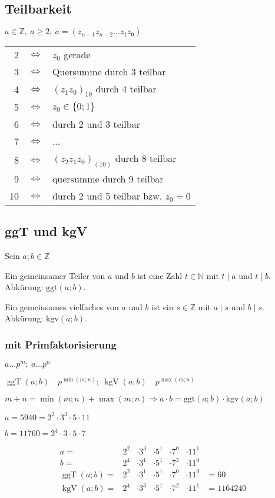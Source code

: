 \documentclass[12pt,a4paper]{article}
\DeclareMathOperator\ggt{ggT}
\DeclareMathOperator\kgv{kgV}
\begin{document}
\subsection{Teilbarkeit}
$a \in \mathbb{Z},\ a \geq 2,\ a=(z_{n-1}z_{n-2} \dots z_1z_0)$ \\
\begin{tabular}{rcl}
	2  & $\Leftrightarrow$ & $z_0$ gerade                         \\
	3  & $\Leftrightarrow$ & Quersumme durch 3 teilbar            \\
	4  & $\Leftrightarrow$ & $(z_1z_0)_{10}$ durch 4 teilbar      \\
	5  & $\Leftrightarrow$ & $z_0 \in \lbrace 0; 1 \rbrace$       \\
	6  & $\Leftrightarrow$ & durch 2 und 3 teilbar                \\
	7  & $\Leftrightarrow$ & ...                                  \\
	8  & $\Leftrightarrow$ & $(z_2z_1z_0)_{(10)}$ durch 8 teilbar \\
	9  & $\Leftrightarrow$ & quersumme durch 9 teilbar            \\
	10 & $\Leftrightarrow$ & durch 2 und 5 teilbar bzw. $z_0=0$
\end{tabular}
\subsection{ggT und kgV}
Sein $a;b \in \mathbb{Z}$

Ein gemeinsamer Teiler von $a$ und $b$ ist eine Zahl $t \in \mathbb{N}$ mit $t \mid a$ und $t \mid b$. Abkürung: $\textrm{ggt}(a;b)$.

Ein gemeinsames vielfaches von $a$ und $b$ ist ein $s \in \mathbb{Z}$ mit $a \mid s$ und $b \mid s$. Abkürung: $\textrm{kgv}(a;b)$.

\subsubsection{mit Primfaktorisierung}
$a \dots p^m;\ a \dots p^n$

$\ggt(a;b)\quad p^{\min(m;n)};\ \kgv(a;b)\quad p^{\max(m;n)}$

$m + n = \min(m;n) + \max(m;n) \Rightarrow a \cdot b = \textrm{ggt}(a;b) \cdot \textrm{kgv}(a;b)$

$a = 5940 = 2^2 \cdot 3^3 \cdot 5 \cdot 11$

$b = 11760 = 2^4 \cdot 3 \cdot 5 \cdot 7$

$$\begin{array}{rcccccl}
		a =         & 2^2 & \cdot 3^3 & \cdot 5^1 & \cdot 7^0 & \cdot 11^1             \\
		b =         & 2^4 & \cdot 3^1 & \cdot 5^1 & \cdot 7^2 & \cdot 11^0             \\
		\ggt(a;b) = & 2^2 & \cdot 3^1 & \cdot 5^1 & \cdot 7^0 & \cdot 11^0 & = 60      \\
		\kgv(a;b) = & 2^4 & \cdot 3^3 & \cdot 5^1 & \cdot 7^2 & \cdot 11^1 & = 1164240
	\end{array}$$
\end{document}

